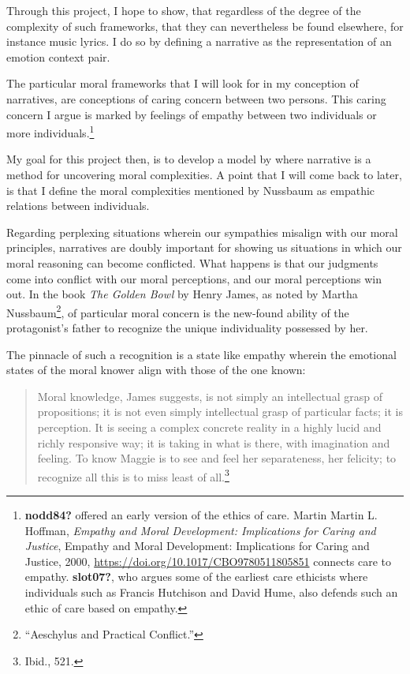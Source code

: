 \documentclass[phdthesis,12pt,final]{wuthesis}
\theoremstyle{definition}
\theoremstyle{definition}
\theoremstyle{definition}
\theoremstyle{definition}
\theoremstyle{remark}
\begin{document}
Through this project, I hope to show, that regardless of the degree of the complexity of such frameworks, that they can nevertheless be found elsewhere, for instance music lyrics. I do so by defining a narrative as the representation of an emotion context pair.

The particular moral frameworks that I will look for in my conception of narratives, are conceptions of caring concern between two persons. This caring concern I argue is marked by feelings of empathy between two individuals or more individuals.\footnote{\textbf{nodd84?} offered an early version of the ethics of care. Martin Martin L. Hoffman, \emph{Empathy and Moral Development: {Implications} for Caring and Justice}, Empathy and Moral Development: {Implications} for Caring and Justice, 2000, \url{https://doi.org/10.1017/CBO9780511805851} connects care to empathy. \textbf{slot07?}, who argues some of the earliest care ethicists where individuals such as Francis Hutchison and David Hume, also defends such an ethic of care based on empathy.}

My goal for this project then, is to develop a model by where narrative is a method for uncovering moral complexities. A point that I will come back to later, is that I define the moral complexities mentioned by Nussbaum as empathic relations between individuals.

Regarding perplexing situations wherein our sympathies misalign with our moral principles, narratives are doubly important for showing us situations in which our moral reasoning can become conflicted. What happens is that our judgments come into conflict with our moral perceptions, and our moral perceptions win out. In the book \emph{The Golden Bowl} by Henry James, as noted by Martha Nussbaum\footnote{{``Aeschylus and Practical Conflict.''}}, of particular moral concern is the new-found ability of the protagonist's father to recognize the unique individuality possessed by her.

The pinnacle of such a recognition is a state like empathy wherein the emotional states of the moral knower align with those of the one known:

\begin{quote}
Moral knowledge, James suggests, is not simply an intellectual grasp of propositions; it is not even simply intellectual grasp of particular facts; it is perception. It is seeing a complex concrete reality in a highly lucid and richly responsive way; it is taking in what is there, with imagination and feeling. To know Maggie is to see and feel her separateness, her felicity; to recognize all this is to miss least of all.\footnote{Ibid., 521.}
\end{quote}
\end{document}
